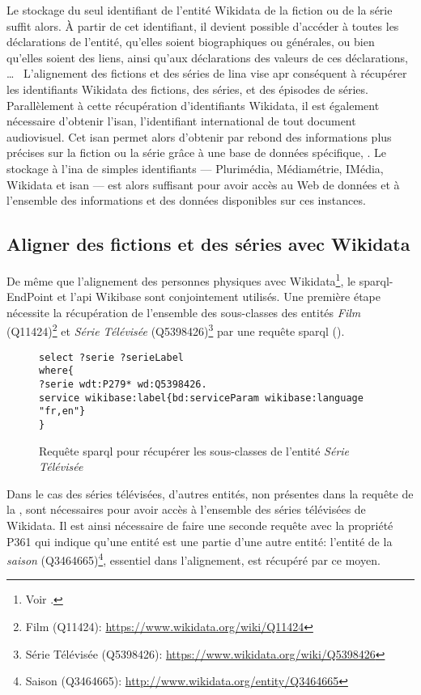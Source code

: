 Le stockage du seul identifiant de l'entité Wikidata de la fiction ou de la série suffit alors. À partir de cet identifiant, il devient possible d'accéder à toutes les déclarations de l'entité, qu'elles soient biographiques ou générales, ou bien qu'elles soient des liens, ainsi qu'aux déclarations des valeurs de ces déclarations, \dots~ L'alignement des fictions et des séries de l\ac{ina} vise apr conséquent à récupérer les identifiants Wikidata des fictions, des séries, et des épisodes de séries.\\

Parallèlement à cette récupération d'identifiants Wikidata, il est également nécessaire d'obtenir l'\ac{isan}, l'identifiant international de tout document audiovisuel. Cet \ac{isan} permet alors d'obtenir par rebond des informations plus précises sur la fiction ou la série grâce à une base de données spécifique, \cite{noauthor_imdb_nodate}. Le stockage à l'\ac{ina} de simples identifiants --- Plurimédia, Médiamétrie, IMédia, Wikidata et \ac{isan} --- est alors suffisant pour avoir accès au Web de données et à l'ensemble des informations et des données disponibles sur ces instances.

\subsection{\label{III-A-3-b}Aligner des fictions et des séries avec Wikidata}

De même que l'alignement des personnes physiques avec Wikidata\footnote{Voir .}, le \ac{sparql}-EndPoint et l'\ac{api} Wikibase sont conjointement utilisés. Une première étape nécessite la récupération de l'ensemble des sous-classes des entités \textit{Film} (Q11424)\footnote{Film (Q11424): \url{https://www.wikidata.org/wiki/Q11424}} et \textit{Série Télévisée} (Q5398426)\footnote{Série Télévisée (Q5398426): \url{https://www.wikidata.org/wiki/Q5398426}} par une requête \ac{sparql} ().
\begin{figure}[!h]
	\centering
	\begin{verbatim}
select ?serie ?serieLabel
where{
?serie wdt:P279* wd:Q5398426.
service wikibase:label{bd:serviceParam wikibase:language "fr,en"}
}
	\end{verbatim}
	\caption{Requête \ac{sparql} pour récupérer les sous-classes de l'entité \textit{Série Télévisée}}
	\label{sparql_1}
\end{figure}
Dans le cas des séries télévisées, d'autres entités, non présentes dans la requête de la , sont nécessaires pour avoir accès à l'ensemble des séries télévisées de Wikidata. Il est ainsi nécessaire de faire une seconde requête avec la propriété P361 qui indique qu'une entité est \og une partie d'\fg{}une autre entité: l'entité de la \textit{saison} (Q3464665)\footnote{Saison (Q3464665): \url{http://www.wikidata.org/entity/Q3464665}}, essentiel dans l'alignement, est récupéré par ce moyen.\\


